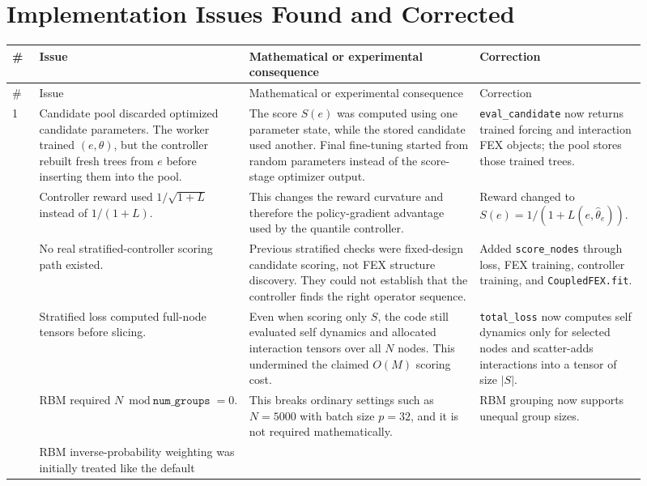 \documentclass[11pt]{article}
\begin{document}
\section{Implementation Issues Found and Corrected}

\begin{longtable}{p{0.04\linewidth} p{0.31\linewidth} p{0.34\linewidth} p{0.22\linewidth}}
\toprule
\# & Issue & Mathematical or experimental consequence & Correction \\
\midrule
\endfirsthead
\toprule
\# & Issue & Mathematical or experimental consequence & Correction \\
\midrule
\endhead
1 &
Candidate pool discarded optimized candidate parameters.  The worker trained
$(e,\theta)$, but the controller rebuilt fresh trees from $e$ before inserting
them into the pool. &
The score $S(e)$ was computed using one parameter state, while the stored
candidate used another.  Final fine-tuning started from random parameters
instead of the score-stage optimizer output. &
\verb|eval_candidate| now returns trained forcing and interaction FEX objects;
the pool stores those trained trees. \\
\addlinespace
2 &
Controller reward used $1/\sqrt{1+L}$ instead of $1/(1+L)$. &
This changes the reward curvature and therefore the policy-gradient advantage
used by the quantile controller. &
Reward changed to $S(e)=1/(1+L(e,\widehat{\theta}_e))$. \\
\addlinespace
3 &
No real stratified-controller scoring path existed. &
Previous stratified checks were fixed-design candidate scoring, not FEX
structure discovery.  They could not establish that the controller finds the
right operator sequence. &
Added \verb|score_nodes| through loss, FEX training, controller training, and
\verb|CoupledFEX.fit|. \\
\addlinespace
4 &
Stratified loss computed full-node tensors before slicing. &
Even when scoring only $S$, the code still evaluated self dynamics and
allocated interaction tensors over all $N$ nodes.  This undermined the claimed
$O(M)$ scoring cost. &
\verb|total_loss| now computes self dynamics only for selected nodes and
scatter-adds interactions into a tensor of size $|S|$. \\
\addlinespace
5 &
RBM required $N \bmod \texttt{num\_groups}=0$. &
This breaks ordinary settings such as $N=5000$ with batch size $p=32$, and it
is not required mathematically. &
RBM grouping now supports unequal group sizes. \\
\addlinespace
6 &
RBM inverse-probability weighting was initially treated like the default

\end{longtable}
\end{document}
